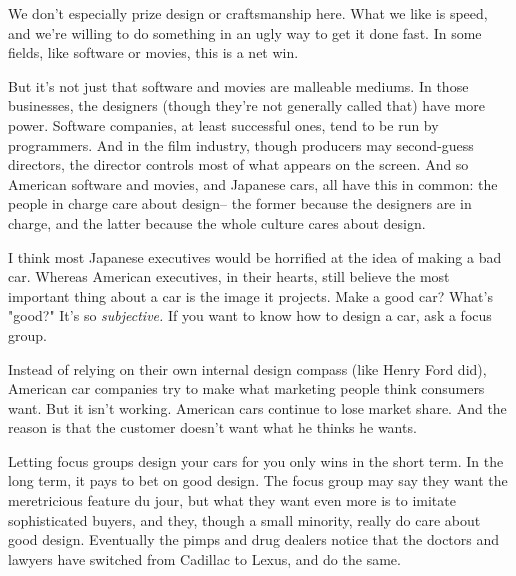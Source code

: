 We
                  don't especially prize design or craftsmanship here. What we
                  like is speed, and we're willing to do something in an ugly
                  way to get it done fast. In some fields, like software or
                  movies, this is a net win.
                  

But it's
                  not just that software and movies are malleable mediums. In
                  those businesses, the designers (though they're not generally
                  called that) have more power. Software companies, at least
                  successful ones, tend to be run by programmers. And in the
                  film industry, though producers may second-guess directors,
                  the director controls most of what appears on the screen. And
                  so American software and movies, and Japanese cars, all have
                  this in common: the people in charge care about design-- the
                  former because the designers are in charge, and the latter
                  because the whole culture cares about design.

I
                  think most Japanese executives would be horrified at the idea
                  of making a bad car. Whereas American executives, in their
                  hearts, still believe the most important thing about a car is
                  the image it projects. Make a good car? What's "good?" It's so
                  \emph{subjective.} If you want to know how to design a car,
                  ask a focus group.

Instead of relying on their own
                  internal design compass (like Henry Ford did), American car
                  companies try to make what marketing people think consumers
                  want. But it isn't working. American cars continue to lose
                  market share. And the reason is that the customer doesn't want
                  what he thinks he wants.

Letting focus groups
                  design your cars for you only wins in the short term. In the
                  long term, it pays to bet on good design. The focus group may
                  say they want the meretricious feature du jour, but what they
                  want even more is to imitate sophisticated buyers, and they,
                  though a small minority, really do care about good design.
                  Eventually the pimps and drug dealers notice that the doctors
                  and lawyers have switched from Cadillac to Lexus, and do the
                  same.


